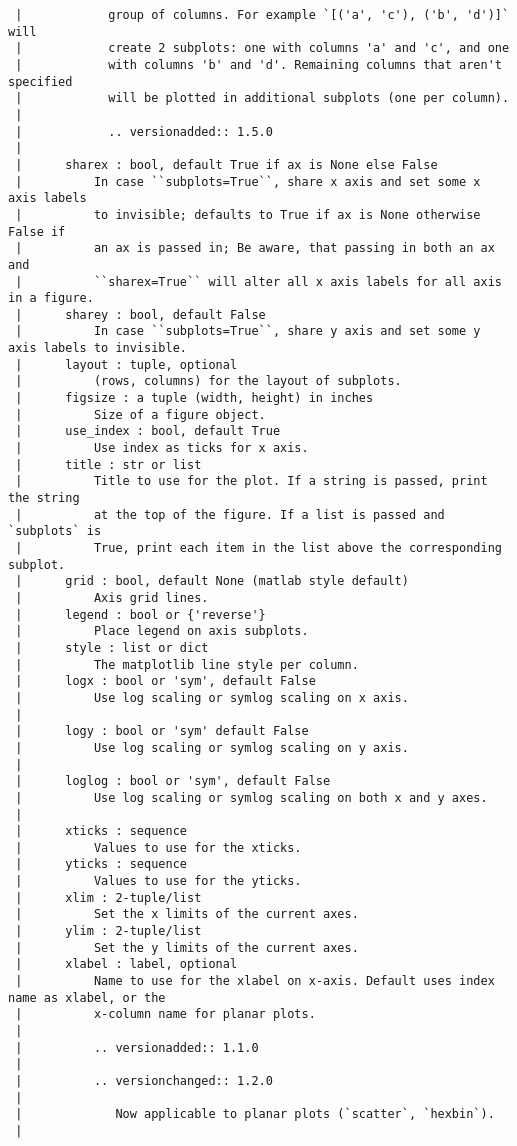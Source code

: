 \documentclass[
  letterpaper,
  DIV=11,
  numbers=noendperiod]{scrreprt}
\begin{document}
\begin{verbatim}
 |            group of columns. For example `[('a', 'c'), ('b', 'd')]` will
 |            create 2 subplots: one with columns 'a' and 'c', and one
 |            with columns 'b' and 'd'. Remaining columns that aren't specified
 |            will be plotted in additional subplots (one per column).
 |      
 |            .. versionadded:: 1.5.0
 |      
 |      sharex : bool, default True if ax is None else False
 |          In case ``subplots=True``, share x axis and set some x axis labels
 |          to invisible; defaults to True if ax is None otherwise False if
 |          an ax is passed in; Be aware, that passing in both an ax and
 |          ``sharex=True`` will alter all x axis labels for all axis in a figure.
 |      sharey : bool, default False
 |          In case ``subplots=True``, share y axis and set some y axis labels to invisible.
 |      layout : tuple, optional
 |          (rows, columns) for the layout of subplots.
 |      figsize : a tuple (width, height) in inches
 |          Size of a figure object.
 |      use_index : bool, default True
 |          Use index as ticks for x axis.
 |      title : str or list
 |          Title to use for the plot. If a string is passed, print the string
 |          at the top of the figure. If a list is passed and `subplots` is
 |          True, print each item in the list above the corresponding subplot.
 |      grid : bool, default None (matlab style default)
 |          Axis grid lines.
 |      legend : bool or {'reverse'}
 |          Place legend on axis subplots.
 |      style : list or dict
 |          The matplotlib line style per column.
 |      logx : bool or 'sym', default False
 |          Use log scaling or symlog scaling on x axis.
 |      
 |      logy : bool or 'sym' default False
 |          Use log scaling or symlog scaling on y axis.
 |      
 |      loglog : bool or 'sym', default False
 |          Use log scaling or symlog scaling on both x and y axes.
 |      
 |      xticks : sequence
 |          Values to use for the xticks.
 |      yticks : sequence
 |          Values to use for the yticks.
 |      xlim : 2-tuple/list
 |          Set the x limits of the current axes.
 |      ylim : 2-tuple/list
 |          Set the y limits of the current axes.
 |      xlabel : label, optional
 |          Name to use for the xlabel on x-axis. Default uses index name as xlabel, or the
 |          x-column name for planar plots.
 |      
 |          .. versionadded:: 1.1.0
 |      
 |          .. versionchanged:: 1.2.0
 |      
 |             Now applicable to planar plots (`scatter`, `hexbin`).
 |      

\end{verbatim}
\end{document}
